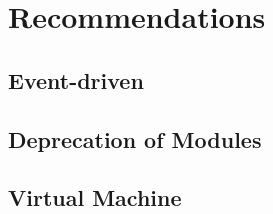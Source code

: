 
\clearpage
\chapter{Recommendations}
\label{ch:recommendations}

\section{Event-driven}
\section{Deprecation of Modules}
\section{Virtual Machine}
